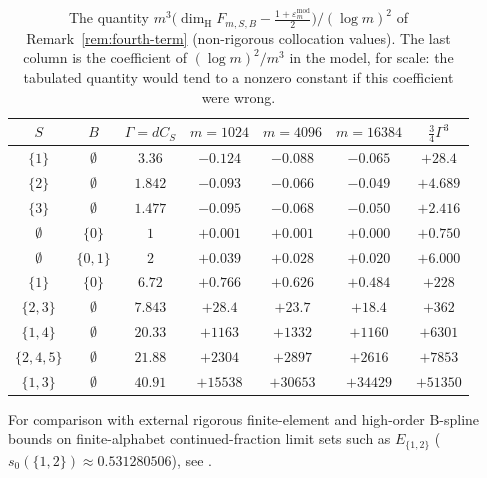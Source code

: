 \documentclass[11pt]{article}
\theoremstyle{definition}
\theoremstyle{remark}
\newcommand{\dimH}{\dim_{\mathrm{H}}}
\begin{document}
\begin{table}[ht]
\centering\small\setlength{\tabcolsep}{4pt}
\begin{tabular}{c|c|c|ccc|c}
$S$ & $B$ & $\Gamma=dC_S$ & $m=1024$ & $m=4096$ & $m=16384$ & $\frac34\Gamma^3$ \\\hline
$\{1\}$ & $\emptyset$ & $3.36$ & $-0.124$ & $-0.088$ & $-0.065$ & $+28.4$ \\
$\{2\}$ & $\emptyset$ & $1.842$ & $-0.093$ & $-0.066$ & $-0.049$ & $+4.689$ \\
$\{3\}$ & $\emptyset$ & $1.477$ & $-0.095$ & $-0.068$ & $-0.050$ & $+2.416$ \\
$\emptyset$ & $\{0\}$ & $1$ & $+0.001$ & $+0.001$ & $+0.000$ & $+0.750$ \\
$\emptyset$ & $\{0,1\}$ & $2$ & $+0.039$ & $+0.028$ & $+0.020$ & $+6.000$ \\
$\{1\}$ & $\{0\}$ & $6.72$ & $+0.766$ & $+0.626$ & $+0.484$ & $+228$ \\
$\{2,3\}$ & $\emptyset$ & $7.843$ & $+28.4$ & $+23.7$ & $+18.4$ & $+362$ \\
$\{1,4\}$ & $\emptyset$ & $20.33$ & $+1163$ & $+1332$ & $+1160$ & $+6301$ \\
$\{2,4,5\}$ & $\emptyset$ & $21.88$ & $+2304$ & $+2897$ & $+2616$ & $+7853$ \\
$\{1,3\}$ & $\emptyset$ & $40.91$ & $+15538$ & $+30653$ & $+34429$ & $+51350$ \\
\end{tabular}
\caption{The quantity $m^3\bigl(\dimH F_{m,S,B}-\frac{1+\varepsilon_m^{\mathrm{mod}}}{2}\bigr)/(\log m)^2$
of Remark~\ref{rem:fourth-term} (non-rigorous collocation values). The last column is the
coefficient of $(\log m)^2/m^3$ in the model, for scale: the tabulated quantity would tend to a
nonzero constant if this coefficient were wrong.}\label{tab:fourth-term}
\end{table}

For comparison with external rigorous finite-element and high-order B-spline bounds on
finite-alphabet continued-fraction limit sets such as $E_{\{1,2\}}$
($s_0(\{1,2\})\approx0.531280506$), see \cite{CLUW2024,CLN2026,Brown2026}.
\end{document}
